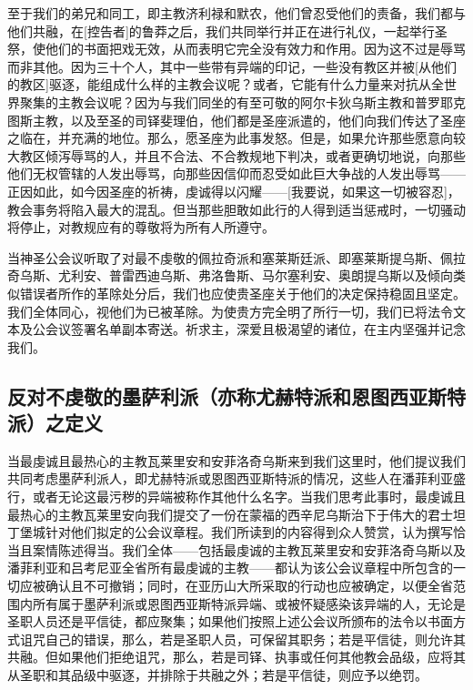 至于我们的弟兄和同工，即主教济利禄和默农，他们曾忍受他们的责备，我们都与他们共融，在[控告者]的鲁莽之后，我们共同举行并正在进行礼仪，一起举行圣祭，使他们的书面把戏无效，从而表明它完全没有效力和作用。因为这不过是辱骂而非其他。因为三十个人，其中一些带有异端的印记，一些没有教区并被[从他们的教区]驱逐，能组成什么样的主教会议呢？或者，它能有什么力量来对抗从全世界聚集的主教会议呢？因为与我们同坐的有至可敬的阿尔卡狄乌斯主教和普罗耶克图斯主教，以及至圣的司铎斐理伯，他们都是圣座派遣的，他们向我们传达了圣座之临在，并充满的地位。那么，愿圣座为此事发怒。但是，如果允许那些愿意向较大教区倾泻辱骂的人，并且不合法、不合教规地下判决，或者更确切地说，向那些他们无权管辖的人发出辱骂，向那些因信仰而忍受如此巨大争战的人发出辱骂——正因如此，如今因圣座的祈祷，虔诚得以闪耀——[我要说，如果这一切被容忍]，教会事务将陷入最大的混乱。但当那些胆敢如此行的人得到适当惩戒时，一切骚动将停止，对教规应有的尊敬将为所有人所遵守。\par

当神圣公会议听取了对最不虔敬的佩拉奇派和塞莱斯廷派、即塞莱斯提乌斯、佩拉奇乌斯、尤利安、普雷西迪乌斯、弗洛鲁斯、马尔塞利安、奥朗提乌斯以及倾向类似错误者所作的革除处分后，我们也应使贵圣座关于他们的决定保持稳固且坚定。我们全体同心，视他们为已被革除。为使贵方完全明了所行一切，我们已将法令文本及公会议签署名单副本寄送。祈求主，深爱且极渴望的诸位，在主内坚强并记念我们。\par


\subsection{反对不虔敬的墨萨利派（亦称尤赫特派和恩图西亚斯特派）之定义}

当最虔诚且最热心的主教瓦莱里安和安菲洛奇乌斯来到我们这里时，他们提议我们共同考虑墨萨利派人，即尤赫特派或恩图西亚斯特派的情况，这些人在潘菲利亚盛行，或者无论这最污秽的异端被称作其他什么名字。当我们思考此事时，最虔诚且最热心的主教瓦莱里安向我们提交了一份在蒙福的西辛尼乌斯治下于伟大的君士坦丁堡城针对他们拟定的公会议章程。我们所读到的内容得到众人赞赏，认为撰写恰当且案情陈述得当。我们全体——包括最虔诚的主教瓦莱里安和安菲洛奇乌斯以及潘菲利亚和吕考尼亚全省所有最虔诚的主教——都认为该公会议章程中所包含的一切应被确认且不可撤销；同时，在亚历山大所采取的行动也应被确定，以便全省范围内所有属于墨萨利派或恩图西亚斯特派异端、或被怀疑感染该异端的人，无论是圣职人员还是平信徒，都应聚集；如果他们按照上述公会议所颁布的法令以书面方式诅咒自己的错误，那么，若是圣职人员，可保留其职务；若是平信徒，则允许其共融。但如果他们拒绝诅咒，那么，若是司铎、执事或任何其他教会品级，应将其从圣职和其品级中驱逐，并排除于共融之外；若是平信徒，则应予以绝罚。\par

